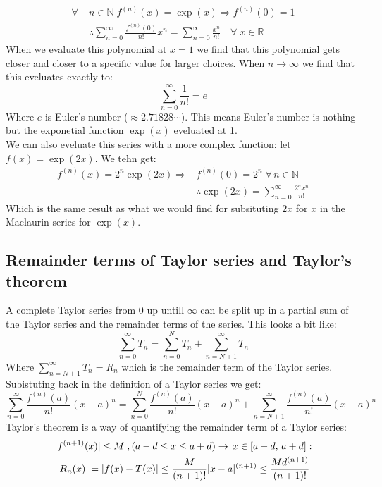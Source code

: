 \documentclass[11pt, a4paper]{article}
\newcommand*{\R}{\ensuremath{\mathbb{R}}}
\newcommand*{\N}{\ensuremath{\mathbb{N}}}
\numberwithin{equation}{section}
\numberwithin{figure}{section}
\begin{document}
\begin{align*}
  \forall\; &n\in\N\;f^{(n)}(x)=\exp(x) \Rightarrow f^{(n)}(0) = 1\\
  &\therefore \sum_{n=0}^\infty \frac{f^{(n)}(0)}{n!} x^n = \sum_{n=0}^\infty \frac{x^n}{n!}\quad \forall \;x\in\R
\end{align*}
When we evaluate this polynomial at $x=1$ we find that this polynomial gets closer and closer to a specific value for larger choices. When $n\to\infty$ we find that this eveluates exactly to:
\begin{equation*}
  \sum_{n=0}^\infty \frac{1}{n!} = e
\end{equation*} 
Where $e$ is Euler's number ($\approx 2.71828\cdots$). This means Euler's number is nothing but the exponetial function $\exp(x)$ eveluated at 1.\\
We can also eveluate this series with a more complex function: let $f(x)=\exp(2x)$. We tehn get:
\begin{align*}
  f^{(n)}(x) = 2^n\exp(2x) \Rightarrow &f^{(n)}(0) = 2^n \; \forall\,n\in\N\\
  &\therefore \exp(2x) = \sum_{n=0}^{\infty} \frac{2^nx^n}{n!}
\end{align*}
Which is the same result as what we would find for subsituting $2x$ for $x$ in the Maclaurin series for $\exp(x)$.


\subsection{Remainder terms of Taylor series and Taylor's theorem}
A complete Taylor series from 0 up untill $\infty$ can be split up in a partial sum of the Taylor series and the remainder terms of the series. This looks a bit like:
\begin{equation}
  \sum_{n=0}^{\infty} T_n = \sum_{n=0}^{N} T_n + \sum_{n=N+1}^{\infty} T_n
\end{equation}
Where $\sum_{n=N+1}^{\infty} T_n = R_n$ which is the remainder term of the Taylor series. Subistuting back in the definition of a Taylor series we get:
\begin{equation}
  \sum_{n=0}^\infty \frac{f^{(n)}(a)}{n!}(x-a)^n = \sum_{n=0}^N \frac{f^{(n)}(a)}{n!}(x-a)^n + \sum_{n=N+1}^\infty \frac{f^{(n)}(a)}{n!}(x-a)^n
\end{equation}
Taylor's theorem is a way of quantifying the remainder term of a Taylor series:
\begin{gather}
  |f^{(n+1)}(x)|\leq M\;, \left(a-d\leq x \leq a+d\right) \rightarrow \,x\in[a-d,\,a+d]: \notag\\
  |R_n(x)| = |f(x) - T(x)| \leq \frac{M}{(n+1)!}|x-a|^{(n+1)} \leq \frac{Md^{(n+1)}}{(n+1)!}
\end{gather}
\end{document}
